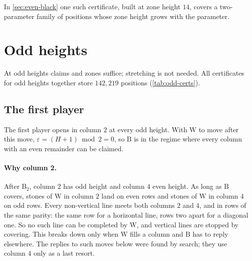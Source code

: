 \documentclass[11pt,a4paper]{article}
\theoremstyle{plain}
\theoremstyle{definition}
\newcommand{\B}{\mathrm{B}}
\newcommand{\W}{\mathrm{W}}
\newcommand{\eps}{\varepsilon}
\begin{document}
In \cref{sec:even-black} one such certificate, built at zone height $14$, covers a two-parameter family of positions whose zone height grows with the parameter.

\section{Odd heights}
\label{sec:odd}

At odd heights claims and zones suffice; stretching is not needed. All certificates for odd heights together store $142{,}219$ positions (\cref{tab:odd-certs}).

\subsection{The first player}
\label{sec:odd-black}

The first player opens in column $2$ at every odd height. With $\W$ to move after this move, $\eps=(H+1)\bmod 2=0$, so $\B$ is in the regime where every column with an even remainder can be claimed.

\paragraph{Why column 2.} After $\B_2$, column $2$ has odd height and column $4$ even height. As long as $\B$ covers, stones of $\W$ in column $2$ land on even rows and stones of $\W$ in column $4$ on odd rows. Every non-vertical line meets both columns $2$ and $4$, and in rows of the same parity: the same row for a horizontal line, rows two apart for a diagonal one. So no such line can be completed by $\W$, and vertical lines are stopped by covering. This breaks down only when $\W$ fills a column and $\B$ has to reply elsewhere. The replies to such moves below were found by search; they use column $4$ only as a last resort.
\end{document}
